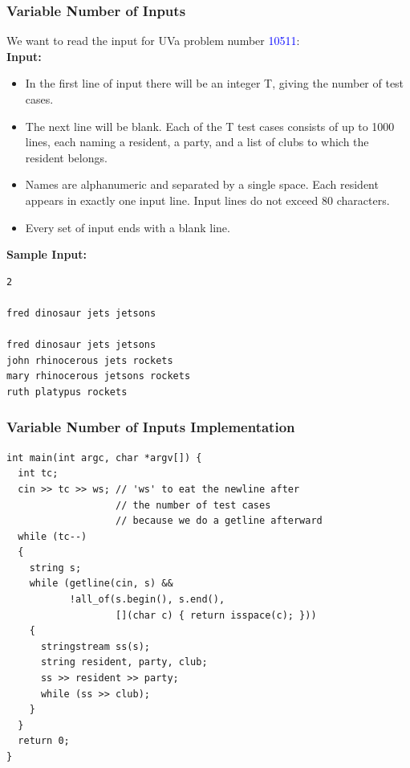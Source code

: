 \documentclass{beamer}
\begin{document}
\begin{frame}[fragile]
\frametitle{Variable Number of Inputs}
\scriptsize

We want to read the input for UVa problem number \textcolor{blue}{10511}:\\
\vspace{0.2cm}
\textbf{Input:}\\
\begin{itemize}
\item<2-> In the first line of input there will be an integer T, giving the number of test cases.

\item<3-> The next line will be blank. Each of the T test cases consists of up to 1000 lines, each naming a resident, a party, and a list of clubs to which the resident belongs.

\item<4-> Names are alphanumeric and separated by a single space. Each resident appears in exactly one input line. Input lines do not exceed 80 characters.

\item<5-> Every set of input ends with a blank line.
\end{itemize}

\vspace{0.2cm}


\textbf{Sample Input:}\\
\begin{verbatim}
2

fred dinosaur jets jetsons

fred dinosaur jets jetsons
john rhinocerous jets rockets
mary rhinocerous jetsons rockets
ruth platypus rockets
\end{verbatim}


\end{frame}


\begin{frame}[containsverbatim]
\frametitle{Variable Number of Inputs Implementation}
\scriptsize

\begin{lstlisting}
int main(int argc, char *argv[]) {
  int tc;
  cin >> tc >> ws; // 'ws' to eat the newline after
                   // the number of test cases
                   // because we do a getline afterward
  while (tc--)
  {
    string s;
    while (getline(cin, s) &&
           !all_of(s.begin(), s.end(),
                   [](char c) { return isspace(c); }))
    {
      stringstream ss(s);
      string resident, party, club;
      ss >> resident >> party;
      while (ss >> club);
    }
  }
  return 0;
}
\end{lstlisting}


\end{frame}
\end{document}
